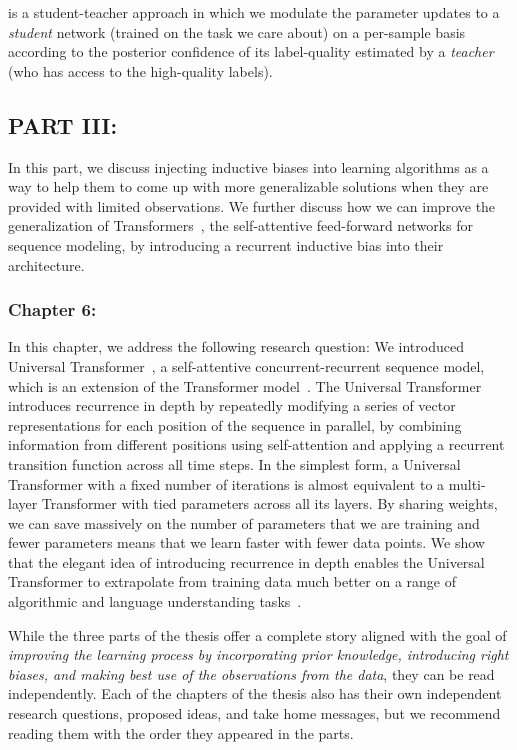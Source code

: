 \fwl is a student-teacher approach in which we modulate the parameter updates to a \emph{student} network (trained on the task we care about) on a per-sample basis according to the posterior confidence of its label-quality estimated by a \emph{teacher} (who has access to the high-quality labels).  

\subsection*{PART III: }
In this part, we discuss injecting inductive biases into learning algorithms as a way to help them to come up with more generalizable solutions when they are provided with limited observations. We further discuss how we can improve the generalization of Transformers~\citep{transformer}, the self-attentive feed-forward networks for sequence modeling, by introducing a recurrent inductive bias into their architecture.

\subsubsection*{Chapter 6: }
In this chapter, we address the following research question:
We introduced Universal Transformer~\citep{Dehghani:ICLR:2019}, a self-attentive concurrent-recurrent sequence model, which is an extension of the Transformer model~\citep{vaswani2017attention}. The Universal Transformer introduces recurrence in depth by repeatedly modifying a series of vector representations for each position of the sequence in parallel, by combining information from different positions using self-attention and applying a recurrent transition function across all time steps. 
In the simplest form, a Universal Transformer with a fixed number of iterations is almost equivalent to a multi-layer Transformer with tied parameters across all its layers. By sharing weights, we can save massively on the number of parameters that we are training and fewer parameters means that we learn faster with fewer data points.  We show that the elegant idea of introducing recurrence in depth enables the Universal Transformer to extrapolate from training data much better on a range of algorithmic and language understanding tasks~\citep{Dehghani:ICLR:2019, Dehghani:2019:WSDM}.

\bigskip
While the three parts of the thesis offer a complete story aligned with the goal of \emph{improving the learning process by incorporating prior knowledge, introducing right biases, and making best use of the observations from the data}, they can be read independently. 
Each of the chapters of the thesis also has their own independent research questions, proposed ideas, and take home messages, but we recommend reading them with the order they appeared in the parts.


